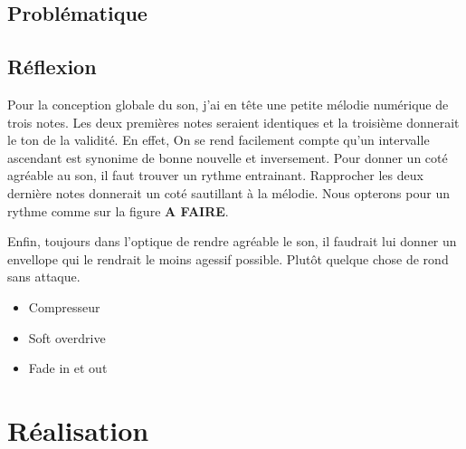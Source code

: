 \documentclass[12pt]{report}
\begin{document}
\section{Problématique}

\section{Réflexion}

Pour la conception globale du son, j'ai en tête une petite mélodie numérique de trois notes. %
Les deux premières notes seraient identiques et la troisième donnerait le ton de la validité. En effet, %
On se rend facilement compte qu'un intervalle ascendant est synonime de bonne nouvelle et inversement. %
Pour donner un coté agréable au son, il faut trouver un rythme entrainant. Rapprocher les deux dernière notes %
donnerait un coté sautillant à la mélodie. Nous opterons pour un rythme comme sur la figure \textbf{A FAIRE}.%

Enfin, toujours dans l'optique de rendre agréable le son, il faudrait lui donner un envellope qui %
le rendrait le moins agessif possible. Plutôt quelque chose de rond sans attaque.

\begin{itemize}
    \item Compresseur
    \item Soft overdrive
    \item Fade in et out 
\end{itemize}

\chapter{Réalisation}
\end{document}
